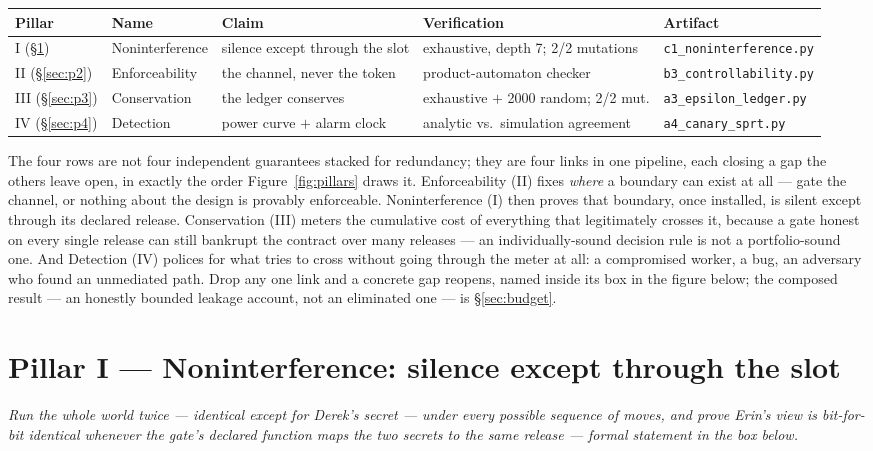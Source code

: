 \documentclass[11pt,a4paper]{article}
\newcommand{\onebreath}[1]{\begin{center}\emph{#1}\end{center}}
\begin{document}
\begin{center}
\begin{tabular}{@{}lllll@{}}
\toprule
Pillar & Name & Claim & Verification & Artifact \\
\midrule
I (\S\ref{sec:p1}) & Noninterference & silence except through the slot & exhaustive, depth 7; 2/2 mutations &
\texttt{c1\_noninterference.py} \\
II (\S\ref{sec:p2}) & Enforceability & the channel, never the token & product-automaton checker &
\texttt{b3\_controllability.py} \\
III (\S\ref{sec:p3}) & Conservation & the ledger conserves & exhaustive $+$ 2000 random; 2/2 mut. &
\texttt{a3\_epsilon\_ledger.py} \\
IV (\S\ref{sec:p4}) & Detection & power curve $+$ alarm clock & analytic vs.\ simulation agreement &
\texttt{a4\_canary\_sprt.py} \\
\bottomrule
\end{tabular}
\end{center}

The four rows are not four independent guarantees stacked for redundancy; they are four links in one pipeline, each closing a gap
the others leave open, in exactly the order Figure~\ref{fig:pillars} draws it. Enforceability (II) fixes \emph{where} a boundary
can exist at all --- gate the channel, or nothing about the design is provably enforceable. Noninterference (I) then proves that
boundary, once installed, is silent except through its declared release. Conservation (III) meters the cumulative cost of
everything that legitimately crosses it, because a gate honest on every single release can still bankrupt the contract over many
releases --- an individually-sound decision rule is not a portfolio-sound one. And Detection (IV) polices for what tries to cross
without going through the meter at all: a compromised worker, a bug, an adversary who found an unmediated path. Drop any one link
and a concrete gap reopens, named inside its box in the figure below; the composed result --- an honestly bounded leakage account,
not an eliminated one --- is \S\ref{sec:budget}.



\section{Pillar I --- Noninterference: silence except through the slot}\label{sec:p1}

\onebreath{Run the whole world twice --- identical except for Derek's secret --- under every
possible sequence of moves, and prove Erin's view is bit-for-bit identical whenever the gate's declared function maps the two
secrets to the same release --- formal statement in the box below.}
\end{document}
